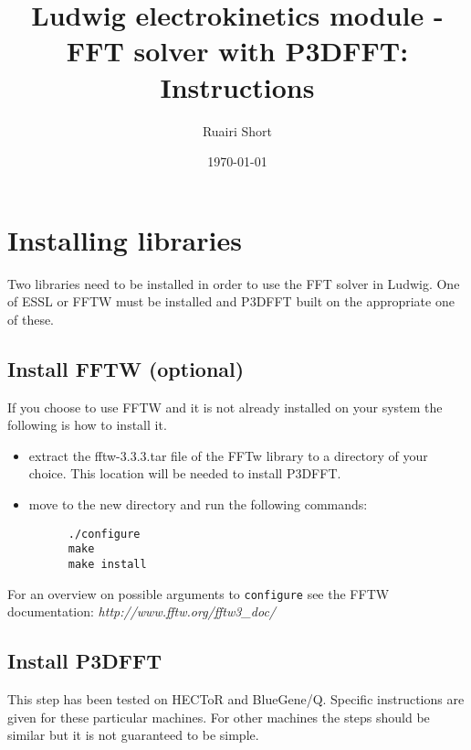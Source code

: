 \documentclass[12pt,a4paper]{article}
\begin{document}


\setcounter{secnumdepth}{3}



\title{Ludwig electrokinetics module - FFT solver with P3DFFT:\\ Instructions}
\author{Ruairi Short}
\date{\today}

\maketitle

\tableofcontents
\clearpage



\section{Installing libraries}
Two libraries need to be installed in order to use the FFT solver in Ludwig.
One of ESSL or FFTW must be installed and P3DFFT built on the appropriate one of these.

\subsection{Install FFTW (optional)}
If you choose to use FFTW and it is not already installed on your system the following is how to install it.
  \begin{itemize}
  \item extract the fftw-3.3.3.tar file of the FFTw library to a directory of your choice. This location will be needed to install P3DFFT.
  \item move to the new directory and run the following commands:
    \begin{verbatim}
      ./configure
      make
      make install
    \end{verbatim}
  \end{itemize}

For an overview on possible arguments to \texttt{configure} see the FFTW documentation: \textit{http://www.fftw.org/fftw3\_doc/}

\subsection{Install P3DFFT}
  This step has been tested on HECToR and BlueGene/Q. Specific instructions are given for these particular machines. For other machines the steps should be similar but it is not guaranteed to be simple.
\end{document}
